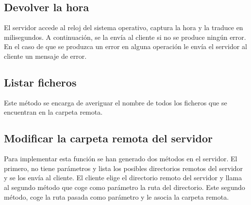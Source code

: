 \subsection{Devolver la hora}
El servidor accede al reloj del sistema operativo, captura la hora y la traduce en milisegundos. A continuación, se la envía al cliente si no se produce ningún error. En el caso de que se produzca un error en alguna operación le envía el servidor al cliente un mensaje de error.

\subsection{Listar ficheros}
Este método se encarga de averiguar el nombre de todos los ficheros que se encuentran en la carpeta remota.

\subsection{Modificar la carpeta remota del servidor}
Para implementar esta función se han generado dos métodos en el servidor. El primero, no tiene parámetros y lista los posibles directorios remotos del servidor y se los envía al cliente. El cliente elige el directorio remoto del servidor y llama al segundo método que coge como parámetro la ruta del directorio. Este segundo método, coge la ruta pasada como parámetro y le asocia la carpeta remota.

